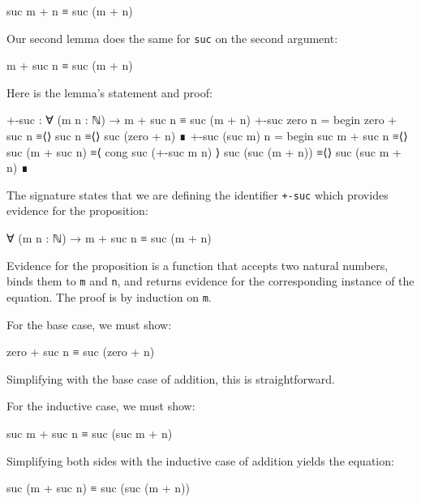 \begin{myDisplay}
suc m + n ≡ suc (m + n)
\end{myDisplay}

Our second lemma does the same for \texttt{suc} on the second argument:

\begin{myDisplay}
m + suc n ≡ suc (m + n)
\end{myDisplay}

Here is the lemma's statement and proof:

\begin{fence}
\begin{code}
+-suc : ∀ (m n : ℕ) → m + suc n ≡ suc (m + n)
+-suc zero n =
  begin
    zero + suc n
  ≡⟨⟩
    suc n
  ≡⟨⟩
    suc (zero + n)
  ∎
+-suc (suc m) n =
  begin
    suc m + suc n
  ≡⟨⟩
    suc (m + suc n)
  ≡⟨ cong suc (+-suc m n) ⟩
    suc (suc (m + n))
  ≡⟨⟩
    suc (suc m + n)
  ∎
\end{code}
\end{fence}

The signature states that we are defining the identifier \texttt{+-suc}
which provides evidence for the proposition:

\begin{myDisplay}
∀ (m n : ℕ) → m + suc n ≡ suc (m + n)
\end{myDisplay}

Evidence for the proposition is a function that accepts two natural
numbers, binds them to \texttt{m} and \texttt{n}, and returns evidence
for the corresponding instance of the equation. The proof is by
induction on \texttt{m}.

For the base case, we must show:

\begin{myDisplay}
zero + suc n ≡ suc (zero + n)
\end{myDisplay}

Simplifying with the base case of addition, this is straightforward.

For the inductive case, we must show:

\begin{myDisplay}
suc m + suc n ≡ suc (suc m + n)
\end{myDisplay}

Simplifying both sides with the inductive case of addition yields the
equation:

\begin{myDisplay}
suc (m + suc n) ≡ suc (suc (m + n))
\end{myDisplay}

